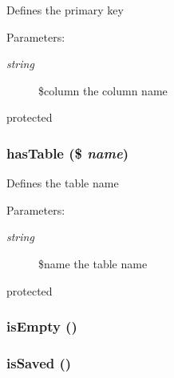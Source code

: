 Defines the primary key

\begin{Desc}
\item[Parameters:]
\begin{description}
\item[{\em string}]\$column the column name\end{description}
\end{Desc}
protected \hypertarget{class_cahnory_d_b___record_ca9bac350ad668703ba2890e0881d4fc}{
\subsubsection[{hasTable}]{\setlength{\rightskip}{0pt plus 5cm}hasTable (\$ {\em name})}}
\label{class_cahnory_d_b___record_ca9bac350ad668703ba2890e0881d4fc}


Defines the table name

\begin{Desc}
\item[Parameters:]
\begin{description}
\item[{\em string}]\$name the table name\end{description}
\end{Desc}
protected \hypertarget{class_cahnory_d_b___record_edcc52b3673b8df9425e52f13accb2a1}{
\subsubsection[{isEmpty}]{\setlength{\rightskip}{0pt plus 5cm}isEmpty ()}}
\label{class_cahnory_d_b___record_edcc52b3673b8df9425e52f13accb2a1}


\hypertarget{class_cahnory_d_b___record_6b93ceb8cecf73af4c402ffb4c184e45}{
\subsubsection[{isSaved}]{\setlength{\rightskip}{0pt plus 5cm}isSaved ()}}
\label{class_cahnory_d_b___record_6b93ceb8cecf73af4c402ffb4c184e45}



